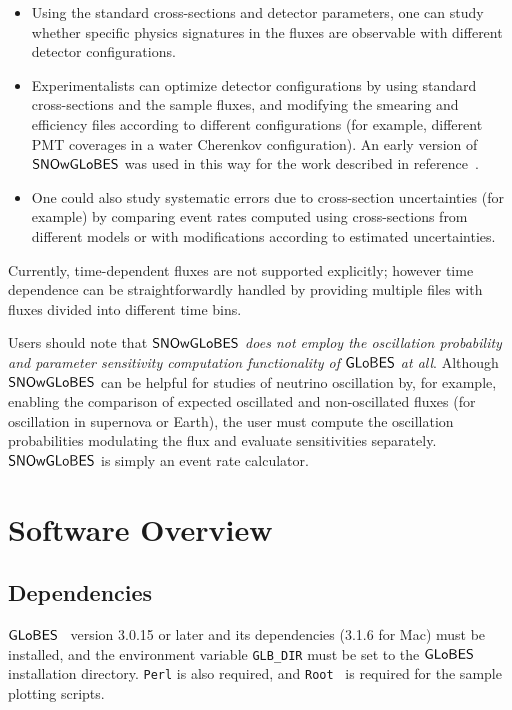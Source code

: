 \documentclass[12pt]{article}
\newcommand{\globes}{\sf{GLoBES}}
\newcommand{\snowglobes}{\sf{SNOwGLoBES}}
\begin{document}
\begin{itemize}

\item Using the standard cross-sections and detector parameters, one
  can study whether specific physics signatures in the fluxes are observable
  with different detector configurations.

\item Experimentalists can optimize detector configurations by using
  standard cross-sections and the sample fluxes, and modifying the
  smearing and efficiency files according to different configurations
  (for example, different PMT coverages in a water Cherenkov configuration).  An early version of $\snowglobes$ was used in this way for the work described in reference~\cite{pwgstudy}.

\item 
One could also study systematic errors due to cross-section
uncertainties (for example) by comparing event rates computed using cross-sections
from different models or with modifications according to estimated
uncertainties.

\end{itemize}

Currently, time-dependent fluxes are not supported explicitly; however
time dependence can be straightforwardly handled by providing multiple
files with fluxes divided into different time bins.

Users should note that \textit{$\snowglobes$ does not employ the oscillation probability and parameter sensitivity computation functionality of $\globes$ at all}.  Although $\snowglobes$ can be helpful for studies of neutrino oscillation by, for example, enabling the comparison of expected  oscillated and non-oscillated fluxes (for oscillation in supernova or Earth), the user must compute the oscillation probabilities modulating the flux and evaluate sensitivities separately.
$\snowglobes$ is simply an event rate calculator.

\section{Software Overview}

\subsection{Dependencies}

$\globes$~\cite{globes} version 3.0.15 or later and its dependencies
(3.1.6 for Mac)  must be installed, and the
environment variable \texttt{GLB\_DIR} must be set to the $\globes$
installation directory.  \texttt{Perl} is also required, and \texttt{Root}~\cite{root} is required for the sample plotting scripts.
\end{document}
